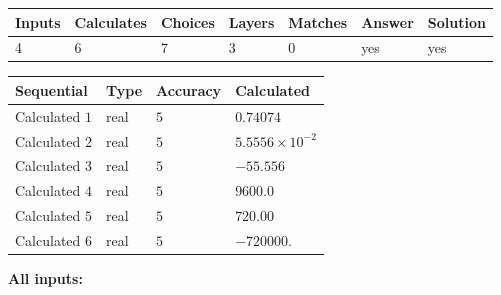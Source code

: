 \documentclass[12pt]{article}
\begin{document}
 

 
\vspace{0.3in}
   
   
   
   
\noindent\begin{tabular}{|l|l|l|l|l|l|l|}
 \hline
Inputs & Calculates & Choices & Layers & Matches & Answer & Solution \\ \hline
           4  & 
           6  & 
           7
  & 
           3  & 
           0  & 
  yes & 
  yes 
  \\ \hline
 \end{tabular}
   
   
   
   
\noindent{}
   
   
  
  
\noindent\begin{tabular}{|l|l|l|l|}
\hline
 Sequential & Type & Accuracy & Calculated \\ 
\hline
 
 
  Calculated $            1 $ & real & $            5  $ & 
 $ 0.74074 $ 
 \\  \hline  
 
 
  Calculated $            2 $ & real & $            5  $ & 
 $ 5.5556 \times 10^{-2} $ 
 \\  \hline  
 
 
  Calculated $            3 $ & real & $            5  $ & 
 $ -55.556 $ 
 \\  \hline  
 
 
  Calculated $            4 $ & real & $            5  $ & 
 $ 9600.0 $ 
 \\  \hline  
 
 
  Calculated $            5 $ & real & $            5  $ & 
 $ 720.00 $ 
 \\  \hline  
 
 
  Calculated $            6 $ & real & $            5  $ & 
 $ -720000. $ 
 \\  \hline  
 \end{tabular}
   
   
   
   
\noindent\vspace{0.1in}\hspace{-0.08in} {\textbf{\Large{All inputs: }}}
   
   
  
\end{document}
